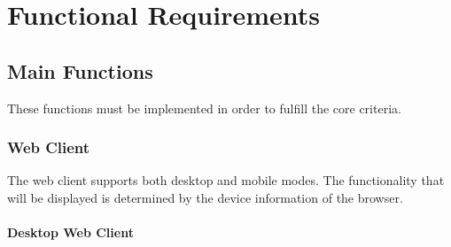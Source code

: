 \section{Functional Requirements}

\subsection{Main Functions}
These functions must be implemented in order to fulfill the core criteria.

\subsubsection{Web Client}
The web client supports both desktop and mobile modes. The functionality that will be displayed is determined by the device information of the browser.

\paragraph{Desktop Web Client}

\def\twodigits#1{%
  \ifnum#1<10 0\fi
  \number#1}

